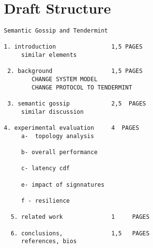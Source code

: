 \section*{Draft Structure}
\small
\begin{verbatim}
Semantic Gossip and Tendermint

1. introduction                1,5 PAGES 
     similar elements
     
 2. background                 1,5 PAGES
        CHANGE SYSTEM MODEL
        CHANGE PROTOCOL TO TENDERMINT
  
 3. semantic gossip            2,5  PAGES     
     similar discussion
     
4. experimental evaluation     4  PAGES
     a-  topology analysis
     
     b- overall performance

     c- latency cdf 

     e- impact of signnatures
    
     f - resilience
                       
  5. related work              1     PAGES
  
  6. conclusions,              1,5   PAGES  
     references, bios  


  \end{verbatim}         
  \normalsize
               